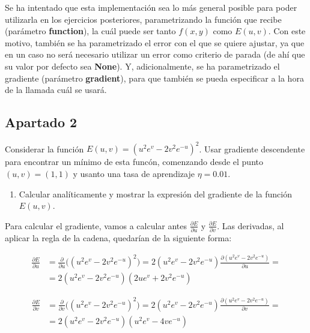 \documentclass[11pt,a4paper]{article}
\begin{document}
Se ha intentado que esta implementación sea lo más general posible para poder utilizarla en los ejercicios
posteriores, parametrizando la función que recibe (parámetro \textbf{function}), la cuál puede ser tanto
$f(x, y)$ como $E(u, v)$. Con este motivo, también se ha parametrizado el error con el que se quiere ajustar,
ya que en un caso no será necesario utilizar un error como criterio de parada (de ahí que su valor por defecto
sea \textbf{None}). Y, adicionalmente, se ha parametrizado el gradiente (parámetro \textbf{gradient}), para que
también se pueda especificar a la hora de la llamada cuál se usará. \\

\subsection*{Apartado 2}
\noindent Considerar la función $E(u, v) = (u^2 e^v - 2 v^2 e^{-u})^2$. Usar gradiente descendente para encontrar un
mínimo de esta funcón, comenzando desde el punto $(u, v) = (1, 1)$ y usanto una tasa de aprendizaje $\eta = 0.01$.

\begin{enumerate}[label=\alph*)]
	\item Calcular analíticamente y mostrar la expresión del gradiente de la función $E(u, v)$.
\end{enumerate}

Para calcular el gradiente, vamos a calcular antes $\frac{\partial E}{\partial u}$ y $\frac{\partial E}{\partial v}$.
Las derivadas, al aplicar la regla de la cadena, quedarían de la siguiente forma:

\begin{equation}
\begin{split}
\frac{\partial E}{\partial u}&= \frac{\partial}{\partial u} \Big( (u^2 e^v - 2 v^2 e^{-u})^2 \Big) = 2(u^2 e^v - 2 v^2 e^{-u})
\frac{\partial (u^2 e^v - 2 v^2 e^{-u})}{\partial u} = \\
 &=  2(u^2 e^v - 2 v^2 e^{-u})(2ue^v + 2 v^2 e^{-u})
\end{split}
\end{equation}

\begin{equation}
\begin{split}
\frac{\partial E}{\partial v}&= \frac{\partial}{\partial v} \Big( (u^2 e^v - 2 v^2 e^{-u})^2 \Big) = 2(u^2 e^v - 2 v^2 e^{-u})
\frac{\partial (u^2 e^v - 2 v^2 e^{-u})}{\partial v} = \\
 &=  2(u^2 e^v - 2 v^2 e^{-u})(u^2 e^v -4 v e^{-u})
\end{split}
\end{equation}
\end{document}
